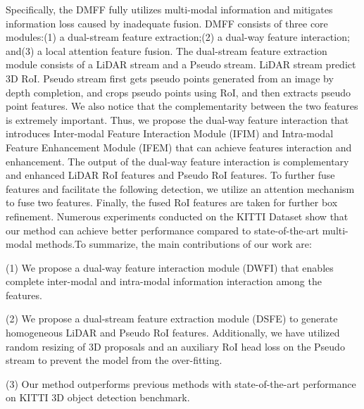 \begin{sloppypar}
Specifically, the DMFF fully utilizes multi-modal information and mitigates information loss caused by inadequate fusion. DMFF consists of three core modules:(1) a dual-stream feature extraction;(2) a dual-way feature interaction; and(3) a local attention feature fusion. The dual-stream feature extraction module consists of a LiDAR stream and a Pseudo stream. LiDAR stream predict 3D RoI. Pseudo stream first gets pseudo points generated from an image by depth completion\cite{15}, and crops pseudo points using RoI, and then extracts pseudo point features. We also notice that the complementarity between the two features is extremely important. Thus, we propose the dual-way feature interaction that introduces Inter-modal Feature Interaction Module (IFIM) and Intra-modal Feature Enhancement Module (IFEM) that can achieve features interaction and enhancement. The output of the dual-way feature interaction is complementary and enhanced LiDAR RoI features and Pseudo RoI features. To further fuse features and facilitate the following detection, we utilize an attention mechanism to fuse two features. Finally, the fused RoI features are taken for further box refinement. Numerous experiments conducted on the KITTI\cite{16} Dataset show that our method can achieve better performance compared to state-of-the-art multi-modal methods.To summarize, the main contributions of our work are:

(1) We propose a dual-way feature interaction module (DWFI) that enables complete inter-modal and intra-modal information interaction among the features.

(2) We propose a dual-stream feature extraction module (DSFE) to generate homogeneous LiDAR and Pseudo RoI features. Additionally, we have utilized random resizing of 3D proposals and an auxiliary RoI head loss on the Pseudo stream to prevent the model from the over-fitting.

(3) Our method outperforms previous methods with state-of-the-art performance on KITTI 3D object detection benchmark.



\end{sloppypar}
